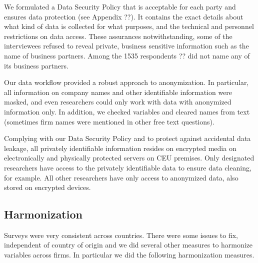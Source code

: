 \documentclass[final, dvipsnames, authoryear,12pt]{elsarticle}
\begin{document}
We formulated a Data Security Policy that is acceptable for each party and ensures data protection (see Appendix ??). It contains the exact details about what kind of data is collected for what purposes, and the technical and personnel restrictions on data access. These assurances notwithstanding, some of the interviewees refused to reveal private, business sensitive information such as the name of business partners. Among the 1535 respondents ?? did not name any of its business partners.

Our data workflow provided a robust approach to anonymization. In particular, all information on company names and other identifiable information were masked, and even researchers could only work with data with anonymized  information only. In addition, we checked variables and cleared names from text (sometimes firm names were mentioned in other free text questions).

Complying with our Data Security Policy and to protect against accidental data leakage, all privately identifiable information resides on encrypted media on electronically and physically protected servers on CEU premises. Only designated researchers have access to the privately identifiable data to ensure data cleaning, for example. All other researchers have only access to anonymized data, also stored on encrypted devices.


\subsection{Harmonization} 

Surveys were very consistent across countries. There were some issues to fix, independent of country of origin and we did several other measures to harmonize variables across firms. In particular we did the following harmonization measures.
\end{document}
